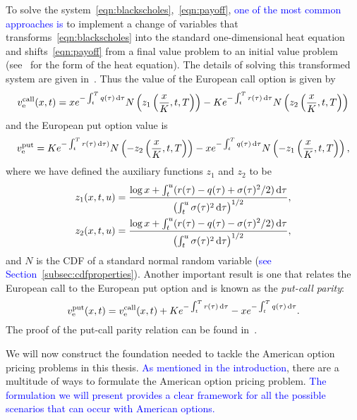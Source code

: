 To solve the system~\eqref{eqn:blackscholes},~\eqref{eqn:payoff}, \textcolor{blue}{one of the most common approaches is} to implement a change of variables that transforms~\eqref{eqn:blackscholes} into the standard one-dimensional heat equation and shifts~\eqref{eqn:payoff} from a final value problem to an initial value problem (see~\cite{cannon1984one} for the form of the heat equation).
The details of solving this transformed system are given in~\cite{Wilmott1995}. Thus the value of the European call option is given by
	\begin{equation}
		\label{eqn:EUcall}
			v_{\text{e}}^{\text{call}}(x,t) = xe^{-\int_t^T q(\tau) \, \mathrm d\tau} N\left(z_1\left( \frac{x}{K}, t, T \right)\right) - K e^{-\int_t^T r(\tau) \, \mathrm d\tau} N\left(z_2\left( \frac{x}{K}, t, T \right)\right)
		\end{equation}
and the European put option value is
	\begin{equation}
		\label{eqn:EUput}
		v_{\text{e}}^{\text{put}} = K e^{-\int_t^T r(\tau) \, \mathrm d\tau) } N\left(-z_2\left( \frac{x}{K}, t, T \right)\right) - xe^{-\int_t^T q(\tau) \, \mathrm d\tau} N\left(-z_1\left( \frac{x}{K}, t, T \right)\right),
	\end{equation}
where we have defined the auxiliary functions $z_1$ and $z_2$ to be
	\begin{align}
		z_1(x,t,u) & = \frac{\log x + \int_t^u (r(\tau) - q(\tau) + \sigma(\tau)^2/2) \, \mathrm d\tau}{\left(\int_t^u \sigma(\tau)^2 \, \mathrm d\tau\right)^{1/2}}, \label{eqn:z1}\\
		z_2(x,t,u) & = \frac{\log x + \int_t^u (r(\tau) - q(\tau) - \sigma(\tau)^2/2) \, \mathrm d\tau}{\left(\int_t^u \sigma(\tau)^2 \, \mathrm d\tau\right)^{1/2}} \label{eqn:z2},
	\end{align}
and $N$ is the CDF of a standard normal random variable (\textcolor{blue}{see Section~\ref{subsec:cdfproperties}}). Another important result is one that relates the European call to the European put option and is known as the \emph{put-call parity}:
	\begin{equation}
		\label{eqn:pcp}
		v_\text{e}^{\text{put}}(x,t) = v_\text{e}^{\text{call}}(x,t) + Ke^{-\int_t^T r(\tau) \, \mathrm d\tau} - xe^{-\int_t^T q(\tau) \, \mathrm d\tau}.
	\end{equation}
The proof of the put-call parity relation can be found in~\cite{Kwok2008}.

We will now construct the foundation needed to tackle the American option pricing problems in this thesis.
\textcolor{blue}{As mentioned in the introduction}, there are a multitude of ways to formulate the American option pricing problem. \textcolor{blue}{The formulation we will present provides a clear framework for all the possible scenarios that can occur with American options.}

